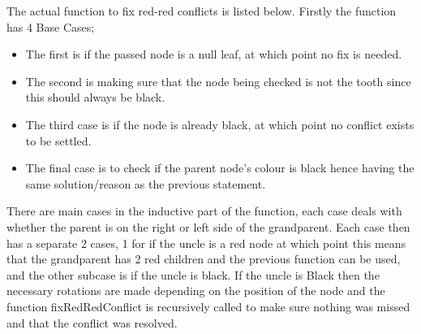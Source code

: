 \documentclass[12pt, a4paper]{report}
\begin{document}
The actual function to fix red-red conflicts is listed below. Firstly the function has 4 Base Cases; 
\begin{itemize}
    \item The first is if the passed node is a null leaf, at which point no fix is needed.
    \item The second is making sure that the node being checked is not the tooth since this should always be black.
    \item The third case is if the node is already black, at which point no conflict exists to be settled.
    \item The final case is to check if the parent node's colour is black hence having the same solution/reason as the previous statement.
\end{itemize}
There are main cases in the inductive part of the function, each case deals with whether the parent is on the right or left side of the grandparent. Each case then has a separate 2 cases, 1 for if the uncle is a red node at which point this means that the grandparent has 2 red children and the previous function can be used, and the other subcase is if the uncle is black. If the uncle is Black then the necessary rotations are made depending on the position of the node and the function fixRedRedConflict is recursively called to make sure nothing was missed and that the conflict was resolved.
\end{document}
